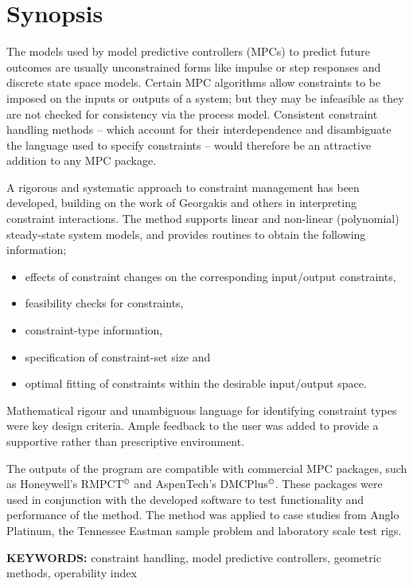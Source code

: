 \chapter*{Synopsis}
The models used by model predictive controllers (MPCs) to predict future outcomes are usually unconstrained forms like impulse or step responses and discrete state space models. 
Certain MPC algorithms allow constraints  to be imposed on the inputs or outputs of a system; but they may be infeasible as they are not checked for consistency via the process model. 
Consistent constraint handling methods -- which account for their interdependence and disambiguate the language used to specify constraints -- would therefore be an attractive addition to any MPC package.

A rigorous and systematic approach to constraint management has been developed, building on the work of Georgakis and others in interpreting constraint interactions. 
The method supports linear and non-linear (polynomial) steady-state system models, and provides routines to obtain the following information;
\begin{itemize}
  \item effects of constraint changes on the corresponding input/output constraints,
  \item feasibility checks for constraints,
  \item constraint-type information,
  \item specification of constraint-set size and
  \item optimal fitting of constraints within the desirable input/output space.
\end{itemize}
Mathematical rigour and unambiguous language for identifying constraint types were key design criteria. 
Ample feedback to the user was added to provide a supportive rather than prescriptive environment.

The outputs of the program are compatible with commercial MPC packages, such as Honeywell's RMPCT$^{\copyright}$ and AspenTech's DMCPlus$^{\copyright}$.
These packages were used in conjunction with the developed software to test functionality and performance of the method.
The method was applied to case studies from Anglo Platinum, the Tennessee Eastman sample problem and laboratory scale test rigs.
\bigskip

\noindent \textbf{KEYWORDS:} constraint handling, model predictive
controllers, geometric methods, operability index


